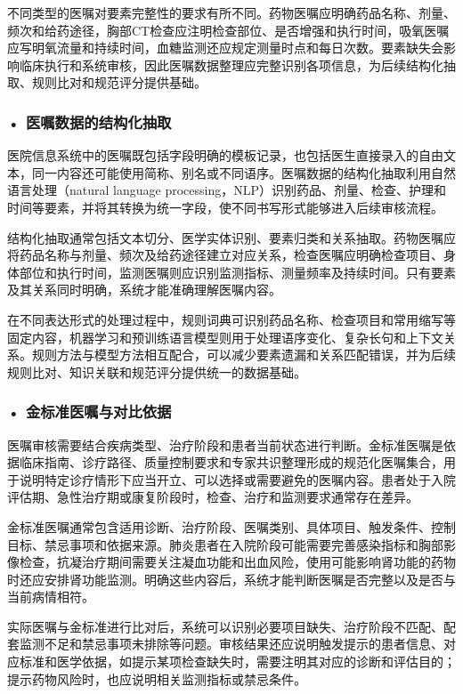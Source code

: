 不同类型的医嘱对要素完整性的要求有所不同。药物医嘱应明确药品名称、剂量、频次和给药途径，胸部CT检查应注明检查部位、是否增强和执行时间，吸氧医嘱应写明氧流量和持续时间，血糖监测还应规定测量时点和每日次数。要素缺失会影响临床执行和系统审核，因此医嘱数据整理应完整识别各项信息，为后续结构化抽取、规则比对和规范评分提供基础。


\subsubsection*{\textbf{• 医嘱数据的结构化抽取}}

医院信息系统中的医嘱既包括字段明确的模板记录，也包括医生直接录入的自由文本，同一内容还可能使用简称、别名或不同语序。医嘱数据的结构化抽取利用自然语言处理（natural language processing，NLP）识别药品、剂量、检查、护理和时间等要素，并将其转换为统一字段，使不同书写形式能够进入后续审核流程。

结构化抽取通常包括文本切分、医学实体识别、要素归类和关系抽取。药物医嘱应将药品名称与剂量、频次及给药途径建立对应关系，检查医嘱应明确检查项目、身体部位和执行时间，监测医嘱则应识别监测指标、测量频率及持续时间。只有要素及其关系同时明确，系统才能准确理解医嘱内容。

在不同表达形式的处理过程中，规则词典可识别药品名称、检查项目和常用缩写等固定内容，机器学习和预训练语言模型则用于处理语序变化、复杂长句和上下文关系。规则方法与模型方法相互配合，可以减少要素遗漏和关系匹配错误，并为后续规则比对、知识关联和规范评分提供统一的数据基础。

\subsubsection*{\textbf{• 金标准医嘱与对比依据}}

医嘱审核需要结合疾病类型、治疗阶段和患者当前状态进行判断。金标准医嘱是依据临床指南、诊疗路径、质量控制要求和专家共识整理形成的规范化医嘱集合，用于说明特定诊疗情形下应当开立、可以选择或需要避免的医嘱内容。患者处于入院评估期、急性治疗期或康复阶段时，检查、治疗和监测要求通常存在差异。

金标准医嘱通常包含适用诊断、治疗阶段、医嘱类别、具体项目、触发条件、控制目标、禁忌事项和依据来源。肺炎患者在入院阶段可能需要完善感染指标和胸部影像检查，抗凝治疗期间需要关注凝血功能和出血风险，使用可能影响肾功能的药物时还应安排肾功能监测。明确这些内容后，系统才能判断医嘱是否完整以及是否与当前病情相符。

实际医嘱与金标准进行比对后，系统可以识别必要项目缺失、治疗阶段不匹配、配套监测不足和禁忌事项未排除等问题。审核结果还应说明触发提示的患者信息、对应标准和医学依据，如提示某项检查缺失时，需要注明其对应的诊断和评估目的；提示药物风险时，也应说明相关监测指标或禁忌条件。

